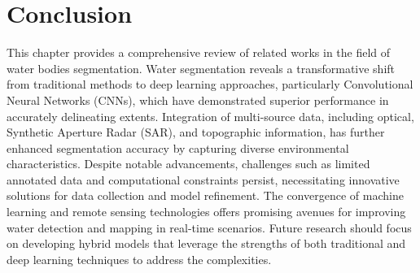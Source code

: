 \section{Conclusion}
This chapter provides a comprehensive review of related works in the field of water bodies segmentation. Water segmentation reveals a transformative shift from traditional methods to deep learning approaches, particularly Convolutional Neural Networks (CNNs), which have demonstrated superior performance in accurately delineating extents. Integration of multi-source data, including optical, Synthetic Aperture Radar (SAR), and topographic information, has further enhanced segmentation accuracy by capturing diverse environmental characteristics. Despite notable advancements, challenges such as limited annotated data and computational constraints persist, necessitating innovative solutions for data collection and model refinement. The convergence of machine learning and remote sensing technologies offers promising avenues for improving water detection and mapping in real-time scenarios. Future research should focus on developing hybrid models that leverage the strengths of both traditional and deep learning techniques to address the complexities.